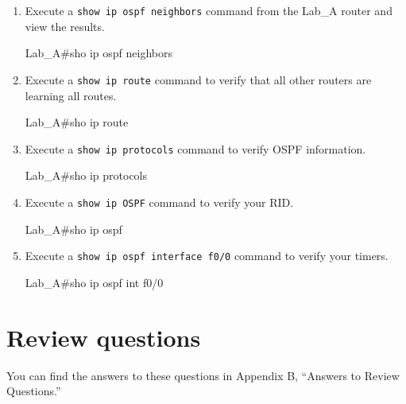 \begin{enumerate}
\item
  Execute a \texttt{show\ ip\ ospf\ neighbors} command from the Lab\_A
  router and view the results.

\begin{cli}
Lab_A#sho ip ospf neighbors
\end{cli}
\item
  Execute a \texttt{show\ ip\ route} command to verify that all other
  routers are learning all routes.

\begin{cli}
Lab_A#sho ip route
\end{cli}
\item
  Execute a \texttt{show\ ip\ protocols} command to verify OSPF
  information.

\begin{cli}
Lab_A#sho ip protocols
\end{cli}
\item
  Execute a \texttt{show\ ip\ OSPF} command to verify your RID.

\begin{cli}
Lab_A#sho ip ospf
\end{cli}
\item
  Execute a \texttt{show\ ip\ ospf\ interface\ f0/0} command to verify
  your timers.

\begin{cli}
Lab_A#sho ip ospf int f0/0
\end{cli}
\end{enumerate}



\section{Review questions}

You can find the answers to these questions in Appendix B, ``Answers to
Review Questions.''

